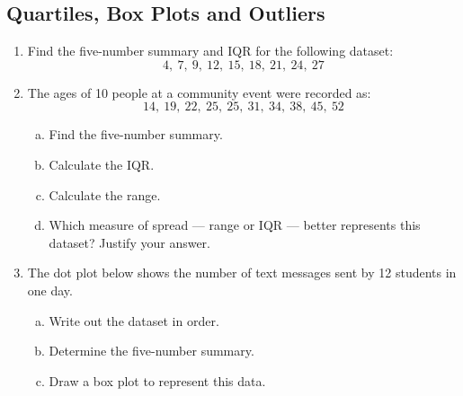 \documentclass{article}
\begin{document}
\subsection{Quartiles, Box Plots and Outliers}
\begin{enumerate}

  \item Find the five-number summary and IQR for the following dataset:
  \[
    4,\ 7,\ 9,\ 12,\ 15,\ 18,\ 21,\ 24,\ 27
  \]

  \item The ages of 10 people at a community event were recorded as:
  \[
    14,\ 19,\ 22,\ 25,\ 25,\ 31,\ 34,\ 38,\ 45,\ 52
  \]
  \begin{enumerate}[(a)]
    \item Find the five-number summary.
    \item Calculate the IQR.
    \item Calculate the range.
    \item Which measure of spread --- range or IQR --- better represents this dataset? Justify
    your answer.
  \end{enumerate}

  \item The dot plot below shows the number of text messages sent by 12 students in one day.
  \begin{center}
  \end{center}
  \begin{enumerate}[(a)]
    \item Write out the dataset in order.
    \item Determine the five-number summary.
    \item Draw a box plot to represent this data.
  \end{enumerate}


\end{enumerate}
\end{document}
